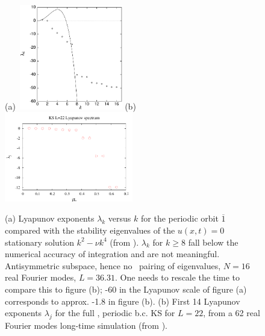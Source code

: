 \begin{figure}
 (a)~\includegraphics[width=0.40\textwidth]{../figs/eigenvalues.ps}
 (b)~\includegraphics[width=0.50\textwidth]{../figs/lyapSpec}
\caption{
(a)
Lyapunov exponents $\lambda_k$ versus $k$ for the periodic
orbit $\overline{1}$ compared with  the stability eigenvalues
of the $u(x,t)=0$ stationary solution $k^2- \nu k^4$ (from
). $\lambda_k$ for $k \geq 8$ fall
below the numerical accuracy of integration and are not
meaningful. Antisymmetric subspace,
hence no \ pairing of eigenvalues, $N=16$ real Fourier
modes, $L=36.31$. One needs to rescale the time to compare
this to figure (b); -60 in the Lyapunov scale of figure (a)
corresponds to approx. -1.8 in figure (b).
(b)
First 14 Lyapunov exponents $\lambda_j$ for the full
\statesp, periodic b.c. KS for $L=22$, from a 62 real Fourier
modes long-time simulation (from ).
}
\label{fig:lyapSpec}
\end{figure}


